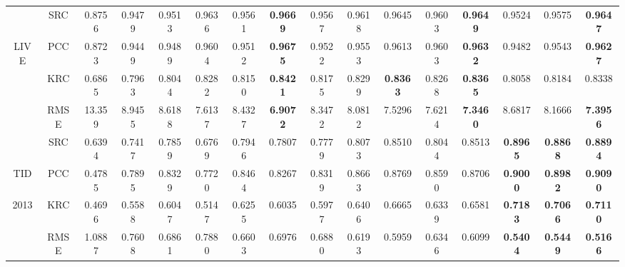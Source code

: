 \begin{table*}[htb]
\begin{tabular}{cccccccccccccccc}
                      & SRC  & 0.8756 & 0.9479 & 0.9513 & 0.9636 & 0.9561 & \textbf{0.9669} & 0.9567 & 0.9618          & 0.9645 & 0.9603          & \textbf{0.9649} & 0.9524          & 0.9575 & \textbf{0.9647}         \\
\multirow{2}{*}{LIVE} & PCC  & 0.8723 & 0.9449 & 0.9489 & 0.9604 & 0.9512 & \textbf{0.9675} & 0.9522 & 0.9553          & 0.9613 & 0.9603          & \textbf{0.9632} & 0.9482          & 0.9543 & \textbf{0.9627}         \\
                      & KRC  & 0.6865 & 0.7963 & 0.8044 & 0.8282 & 0.8150 & \textbf{0.8421} & 0.8175 & 0.8299          & \textbf{0.8363} & 0.8268          & \textbf{0.8365} & 0.8058          & 0.8184 & 0.8338         \\
                      & RMSE & 13.359 & 8.9455 & 8.6188 & 7.6137 & 8.4327 & \textbf{6.9072} & 8.3472 & 8.0812          & 7.5296 & 7.6214          & \textbf{7.3460} & 8.6817          & 8.1666 & \textbf{7.3956}         \\ \hline
                      & SRC  & 0.6394 & 0.7417 & 0.7859 & 0.6769 & 0.7946 & 0.7807          & 0.7779 & 0.8073          & 0.8510          & 0.8044          & 0.8513 & \textbf{0.8965} & \textbf{0.8868} & \textbf{0.8894}\\
TID                   & PCC  & 0.4785 & 0.7895 & 0.8329 & 0.7720 & 0.8464 & 0.8267          & 0.8319 & 0.8663          & 0.8769 & 0.8590          & 0.8706          & \textbf{0.9000} & \textbf{0.8982} & \textbf{0.9090}\\
2013                  & KRC  & 0.4696 & 0.5588 & 0.6047 & 0.5147 & 0.6255 & 0.6035          & 0.5977 & 0.6406          & 0.6665 & 0.6339          & 0.6581          & \textbf{0.7183} & \textbf{0.7066} & \textbf{0.7110}\\
                      & RMSE & 1.0887 & 0.7608 & 0.6861 & 0.7880 & 0.6603 & 0.6976          & 0.6880 & 0.6193          & 0.5959 & 0.6346          & 0.6099          & \textbf{0.5404} & \textbf{0.5449} & \textbf{0.5166}\\ \hline
\end{tabular}
\label{results1}
\end{table*}




